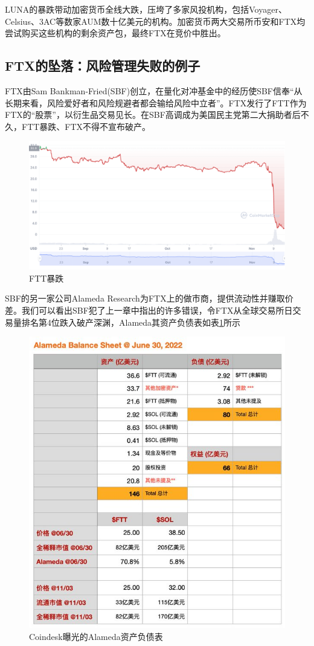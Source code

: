 LUNA的暴跌带动加密货币全线大跌，压垮了多家风投机构，包括Voyager、Celsius、3AC等数家AUM数十亿美元的机构。加密货币两大交易所币安和FTX均尝试购买这些机构的剩余资产包，最终FTX在竞价中胜出。
\subsection{FTX的坠落：风险管理失败的例子}
FTX由Sam Bankman-Fried(SBF)创立，在量化对冲基金中的经历使SBF信奉“从长期来看，风险爱好者和风险规避者都会输给风险中立者”。FTX发行了FTT作为FTX的“股票”，以衍生品交易见长。在SBF高调成为美国民主党第二大捐助者后不久，FTT暴跌、FTX不得不宣布破产。
\begin{figure}[H]
    \includegraphics[width=\linewidth]{img/ftt.png}
    \caption{FTT暴跌}
\end{figure}

SBF的另一家公司Alameda Research为FTX上的做市商，提供流动性并赚取价差。我们可以看出SBF犯了上一章中指出的许多错误，令FTX从全球交易所日交易量排名第4位跌入破产深渊，Alameda其资产负债表如表\ref{fig:bs}所示
\begin{figure}[H]
    \includegraphics[width=\linewidth]{img/alameda_bs.jpeg}
    \caption{Coindesk曝光的Alameda资产负债表}\label{fig:bs}
\end{figure}

